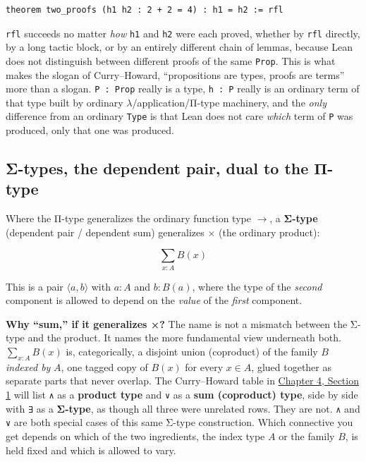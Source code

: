 \begin{lstlisting}
theorem two_proofs (h1 h2 : 2 + 2 = 4) : h1 = h2 := rfl
\end{lstlisting}

\texttt{rfl} succeeds no matter \emph{how} \texttt{h1} and \texttt{h2} were each proved, whether by \texttt{rfl} directly, by a long tactic block, or by an entirely different chain of lemmas, because Lean does not distinguish between different proofs of the same \texttt{Prop}. This is what makes the slogan of Curry--Howard, ``propositions are types, proofs are terms'' more than a slogan. \texttt{P : Prop} really is a type, \texttt{h : P} really is an ordinary term of that type built by ordinary \(\lambda\)/application/Π-type machinery, and the \emph{only} difference from an ordinary \texttt{Type} is that Lean does not care \emph{which} term of \texttt{P} was produced, only that one was produced.

\subsection{Σ-types, the dependent pair, dual to the Π-type}\label{sec:02-terminology-and-coc:02-pi-sigma-and-coc:4}

Where the Π-type generalizes the ordinary function type \(\to\), a \textbf{Σ-type} (dependent pair / dependent sum) generalizes \(\times\) (the ordinary product):

\[
\sum_{x:A} B(x)
\]

This is a pair \(\langle a, b\rangle\) with \(a : A\) and \(b : B(a)\), where the type of the \emph{second} component is allowed to depend on the \emph{value} of the \emph{first} component.

\textbf{Why ``sum,'' if it generalizes ×?} The name is not a mismatch between the Σ-type and the product. It names the more fundamental view underneath both. \(\sum_{x:A} B(x)\) is, categorically, a disjoint union (coproduct) of the family \(B\) \emph{indexed by} \(A\), one tagged copy of \(B(x)\) for every \(x \in A\), glued together as separate parts that never overlap. The Curry--Howard table in \hyperref[sec:04-propositions-and-proofs:01-prop:1]{Chapter 4, Section 1} will list \texttt{∧} as a \textbf{product type} and \texttt{∨} as a \textbf{sum (coproduct) type}, side by side with \texttt{∃} as a \textbf{Σ-type}, as though all three were unrelated rows. They are not. \texttt{∧} and \texttt{∨} are both special cases of this same Σ-type construction. Which connective you get depends on which of the two ingredients, the index type \(A\) or the family \(B\), is held fixed and which is allowed to vary.

